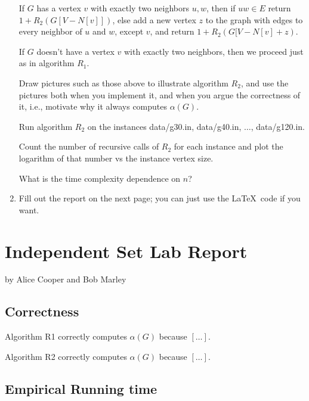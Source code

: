 \documentclass{tufte-handout}
\begin{document}
\begin{enumerate}
  If $G$ has a vertex $v$ with exactly two neighbors $u,w$, then if
  $uw\in E$ return $1+R_2(G[V-N[v]])$, else add a new vertex $z$ to
  the graph with edges to every neighbor of $u$ and $w$, except $v$,
  and return $1+R_2(G[V-N[v]+z)$.

  If $G$ doesn't have a vertex $v$ with exactly two neighbors, then we
  proceed just as in algorithm $R_1$.
 
  Draw pictures such as those above to illustrate algorithm $R_2$, and
  use the pictures both when you implement it, and when you argue the
  correctness of it, i.e., motivate why it always computes
  $\alpha(G)$.
 
  Run algorithm $R_2$ on the instances data/g30.in, data/g40.in,
  $\ldots$, data/g120.in.

  Count the number of recursive calls of $R_2$ for each instance and plot the
  logarithm of that number vs the instance vertex size. 
  
  What is the time complexity dependence on $n$?

\item Fill out the report on the next page; you can just use the
  \LaTeX\ code if you want.
\end{enumerate}

\newpage


\newpage
\section{Independent Set Lab Report}


by Alice Cooper and Bob Marley

\subsection{Correctness}
Algorithm R1 correctly computes $\alpha(G)$ because $[\ldots]$.

\noindent
Algorithm R2 correctly computes $\alpha(G)$ because $[\ldots]$.

\subsection{Empirical Running time}
\end{document}
